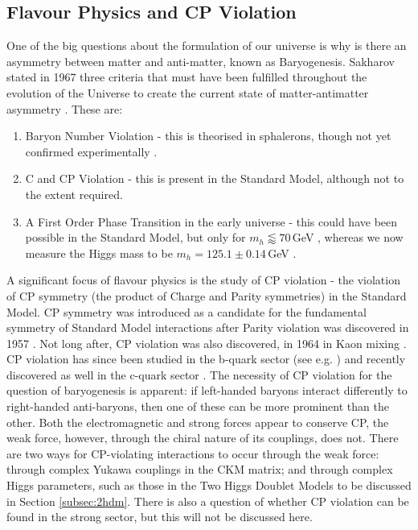 \documentclass[a4paper,12pt]{article}
\begin{document}
\subsection{Flavour Physics and CP Violation}
\label{subsec:flavobs}
One of the big questions about the formulation of our universe is why is there an asymmetry between matter and anti-matter, known as Baryogenesis. 
Sakharov stated in 1967 three criteria that must have been fulfilled throughout the evolution of the Universe to create the current state of matter-antimatter asymmetry \cite{sak}. 
These are:
\begin{enumerate}
    \item Baryon Number Violation - this is theorised in sphalerons, though not yet confirmed experimentally \cite{sphal}. 
    \item C and CP Violation - this is present in the Standard Model, although not to the extent required. 
    \item A First Order Phase Transition in the early universe - this could have been possible in the Standard Model, but only for $m_h\lessapprox70\,$GeV \cite{phase}, whereas we now measure the Higgs mass to be $m_h=125.1\pm0.14\,$GeV \cite{pdg}.
\end{enumerate}
A significant focus of flavour physics is the study of CP violation - the violation of CP symmetry (the product of Charge and Parity symmetries) in the Standard Model.
CP symmetry was introduced as a candidate for the fundamental symmetry of Standard Model interactions after Parity violation was discovered in 1957 \cite{wu}.
Not long after, CP violation was also discovered, in 1964 in Kaon mixing \cite{cpv}.
CP violation has since been studied in the b-quark sector (see e.g. \cite{mix15}) and recently discovered as well in the c-quark sector \cite{charmcp}. 
The necessity of CP violation for the question of baryogenesis is apparent: if left-handed baryons interact differently to right-handed anti-baryons, then one of these can be more prominent than the other. 
Both the electromagnetic and strong forces appear to conserve CP, the weak force, however, through the chiral nature of its couplings, does not.
There are two ways for CP-violating interactions to occur through the weak force: through complex Yukawa couplings in the CKM matrix; and through complex Higgs parameters, such as those in the Two Higgs Doublet Models to be discussed in Section \ref{subsec:2hdm}.
There is also a question of whether CP violation can be found in the strong sector, but this will not be discussed here.
\end{document}
